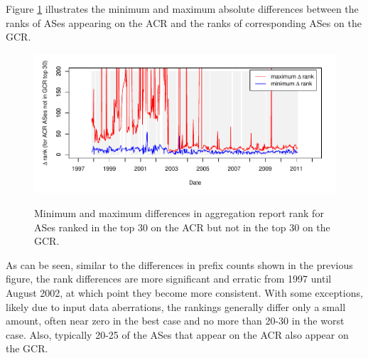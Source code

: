 Figure \ref{fig:comp_rank_error} illustrates the minimum and maximum absolute
differences between the ranks of ASes appearing on the ACR and the ranks of
corresponding ASes on the GCR.

\begin{figure}[h!]
\begin{centering}
\begin{singlespace}
    \includegraphics[width=6in]{figures/cidr_report_validity_rank_error.pdf}
    \vspace{-2em}\\
    \caption[Minimum and maximum differences in aggregation report
    rank]{Minimum and maximum differences in aggregation report rank for ASes
    ranked in the top 30 on the ACR but not in the top 30 on the GCR.}
    \label{fig:comp_rank_error}
\end{singlespace}
\end{centering}
\end{figure}

As can be seen, similar to the differences in prefix counts shown in the
previous figure, the rank differences are more significant and erratic from
1997 until August 2002, at which point they become more consistent. With some
exceptions, likely due to input data aberrations, the rankings generally differ
only a small amount, often near zero in the best case and no more than 20-30
in the worst case. Also, typically 20-25 of the ASes that appear on the ACR
also appear on the GCR.


